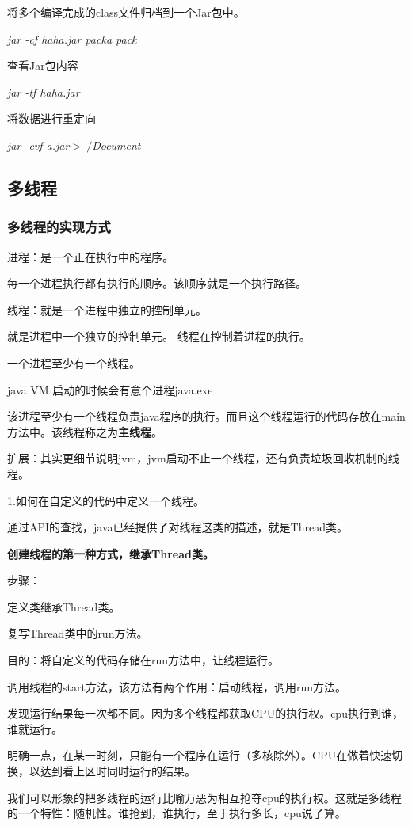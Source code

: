 \documentclass[UTF8]{ctexart}
\begin{document}
\textbullet 将多个编译完成的class文件归档到一个Jar包中。

\textit{jar -cf haha.jar packa pack}

\textbullet 查看Jar包内容

\textit{jar -tf haha.jar}

\textbullet 将数据进行重定向

\textit{jar -cvf a.jar$>~/$Document}

\subsection{多线程}
\subsubsection{多线程的实现方式}
进程：是一个正在执行中的程序。

\qquad 每一个进程执行都有执行的顺序。该顺序就是一个执行路径。

线程：就是一个进程中独立的控制单元。

\qquad 就是进程中一个独立的控制单元。
线程在控制着进程的执行。

一个进程至少有一个线程。

java VM 启动的时候会有意个进程java.exe

该进程至少有一个线程负责java程序的执行。而且这个线程运行的代码存放在main方法中。该线程称之为\textbf{主线程}。

扩展：其实更细节说明jvm，jvm启动不止一个线程，还有负责垃圾回收机制的线程。

1.如何在自定义的代码中定义一个线程。

通过API的查找，java已经提供了对线程这类的描述，就是Thread类。

\textbf{创建线程的第一种方式，继承Thread类。}

步骤：

\textbullet 定义类继承Thread类。

\textbullet 复写Thread类中的run方法。
	
\qquad 目的：将自定义的代码存储在run方法中，让线程运行。

\textbullet 调用线程的start方法，该方法有两个作用：启动线程，调用run方法。

发现运行结果每一次都不同。因为多个线程都获取CPU的执行权。cpu执行到谁，谁就运行。

明确一点，在某一时刻，只能有一个程序在运行（多核除外）。CPU在做着快速切换，以达到看上区时同时运行的结果。

我们可以形象的把多线程的运行比喻万恶为相互抢夺cpu的执行权。这就是多线程的一个特性：随机性。谁抢到，谁执行，至于执行多长，cpu说了算。
\end{document}
